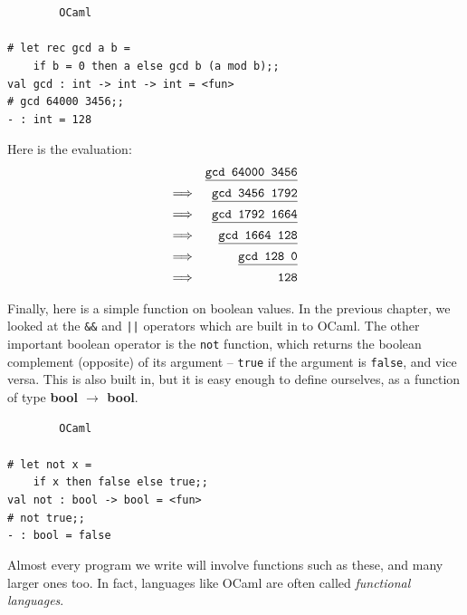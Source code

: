 \documentclass[]{book}
\newcommand{\smspace}{\vspace{4mm}}
\begin{document}
\smspace
\noindent\verb!        OCaml!\\
\noindent\\
\noindent\verb!# let rec gcd a b =!\\
\noindent\verb!    if b = 0 then a else gcd b (a mod b);;!\\
\noindent\verb!val gcd : int -> int -> int = <fun>!\\
\noindent\texttt{\# gcd 64000 3456;;}\\
\noindent\verb!- : int = 128!
\smspace

\noindent Here is the evaluation:
\begin{eqnarray*}
 & & \texttt{\underline{\vphantom{g}gcd 64000 3456}} \\
 \Longrightarrow & & \texttt{\underline{\vphantom{g}gcd 3456 1792}} \\
 \Longrightarrow & & \texttt{\underline{\vphantom{g}gcd 1792 1664}} \\
 \Longrightarrow & & \texttt{\underline{\vphantom{g}gcd 1664 128}} \\
 \Longrightarrow & & \texttt{\underline{\vphantom{g}gcd 128 0}} \\
 \Longrightarrow & & \texttt{128}
\end{eqnarray*}

\noindent Finally, here is a simple function on boolean values. In the previous chapter, we looked at the \texttt{\&\&} and \texttt{||} operators which are built in to OCaml. The other important boolean operator is the \texttt{not} function, which returns the boolean complement (opposite) of its argument -- \texttt{true} if the argument is \texttt{false}, and vice versa. This is also built in, but it is easy enough to define ourselves, as a function of type \textrm{\textbf{bool $\rightarrow$ bool}}.

\smspace
\noindent\verb!        OCaml!\\
\noindent\\
\noindent\verb!# let not x =!\\
\noindent\verb!    if x then false else true;;!\\
\noindent\verb!val not : bool -> bool = <fun>!\\
\noindent\texttt{\# not true;;}\\
\noindent\verb!- : bool = false!
\smspace

\noindent Almost every program we write will involve functions such as these, and many larger ones too. In fact, languages like OCaml are often called \textit{functional languages}.
\end{document}
